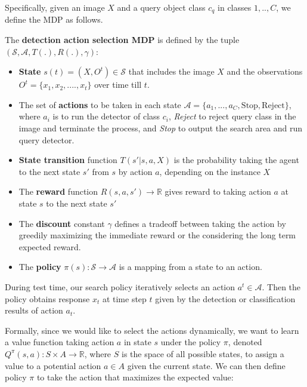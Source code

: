 Specifically, given an image $X$ and a query object class $c_q$ in classes ${1,..,C}$, we define the MDP as follows.
\begin{mydef}
 The \textbf{detection action selection MDP} is defined by the tuple $(\mathcal{S}, \mathcal{A}, T(.), R(.), \gamma)$:
\begin{itemize}
\item \textbf{State} $s(t) = (X, O^t)\in \mathcal{S}$ that includes the image $X$ and the observations $O^t= \{x_1, x_2, ....,x_t\}$ over time till $t$. %
\item The set of \textbf{actions} to be taken in each state $\mathcal{A} = \{a_1, ..., a_C, \mbox{Stop}, \mbox{Reject}\} $, where $a_i$ is to run the detector of class $c_i$, \textit{Reject} to reject query class in the image and terminate the process, and \textit{Stop} to output the search area and run query detector.
\item \textbf{State transition} function $T(s'|s,a, X)$ is the probability taking the agent to the next state $s'$ from $s$ by action $a$, depending on the instance $X$
\item The \textbf{reward} function $R(s,a,s') \rightarrow \mathbb{R}$ gives reward to taking action $a$ at state $s$ to the next state $s'$
\item The \textbf{discount} constant $\gamma$ defines a tradeoff between taking the action by greedily maximizing the immediate reward or the considering the long term expected reward.
\item The \textbf{policy} $\pi(s): \mathcal{S} \rightarrow \mathcal{A}$ is a mapping from a state to an action.
\end{itemize}
\end{mydef}

During test time, our search policy  iteratively selects an action $a^t \in \mathcal{A}$. Then the policy obtains response $x_t$ at time step $t$ given by the detection or classification results of action $a_t$. 

Formally, since we would like to select the actions dynamically, we want to learn a value function taking action $a$ in state $s$ under the policy $\pi$, denoted $Q^\pi(s,a): S\times A \rightarrow \mathbb{R}$, where $S$ is the space of all possible states, to assign a value to a potential action $a\in A$ given the current state. We can then define policy $\pi$ to take the action that maximizes the expected value:

